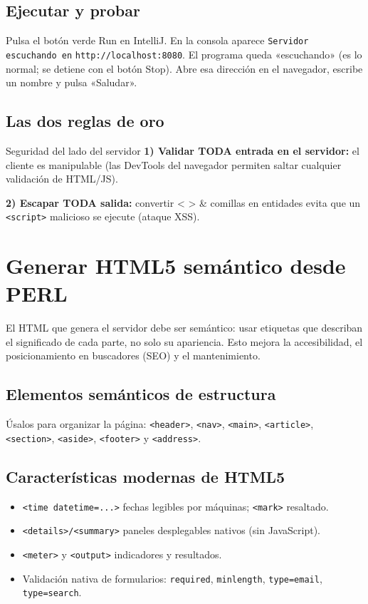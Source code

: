 \documentclass[11pt]{article}
\begin{document}
\subsection{Ejecutar y probar}
Pulsa el botón verde Run en IntelliJ. En la consola aparece \texttt{Servidor escuchando en} \texttt{http://localhost:8080}. El programa queda «escuchando» (es lo normal; se detiene con el botón Stop). Abre esa dirección en el navegador, escribe un nombre y pulsa «Saludar».

\subsection{Las dos reglas de oro}
\begin{cajatip}{Seguridad del lado del servidor}
\textbf{1) Validar TODA entrada en el servidor:} el cliente es manipulable (las DevTools del navegador permiten saltar cualquier validación de HTML/JS).\par
\textbf{2) Escapar TODA salida:} convertir \textless{} \textgreater{} \& comillas en entidades evita que un \texttt{\textless{}script\textgreater{}} malicioso se ejecute (ataque XSS).\par
\end{cajatip}
\section{Generar HTML5 semántico desde PERL}
El HTML que genera el servidor debe ser semántico: usar etiquetas que describan el significado de cada parte, no solo su apariencia. Esto mejora la accesibilidad, el posicionamiento en buscadores (SEO) y el mantenimiento.

\subsection{Elementos semánticos de estructura}
Úsalos para organizar la página: \texttt{\textless{}header\textgreater{}}, \texttt{\textless{}nav\textgreater{}}, \texttt{\textless{}main\textgreater{}}, \texttt{\textless{}article\textgreater{}}, \texttt{\textless{}section\textgreater{}}, \texttt{\textless{}aside\textgreater{}}, \texttt{\textless{}footer\textgreater{}} y \texttt{\textless{}address\textgreater{}}.

\subsection{Características modernas de HTML5}
\begin{itemize}[leftmargin=1.4em,itemsep=2pt,topsep=2pt]
\item \texttt{\textless{}time datetime=...\textgreater{}}  fechas legibles por máquinas; \texttt{\textless{}mark\textgreater{}}  resaltado.
\item \texttt{\textless{}details\textgreater{}/\textless{}summary\textgreater{}}  paneles desplegables nativos (sin JavaScript).
\item \texttt{\textless{}meter\textgreater{}} y \texttt{\textless{}output\textgreater{}}  indicadores y resultados.
\item Validación nativa de formularios: \texttt{required}, \texttt{minlength}, \texttt{type=email}, \texttt{type=search}.
\end{itemize}
\end{document}
